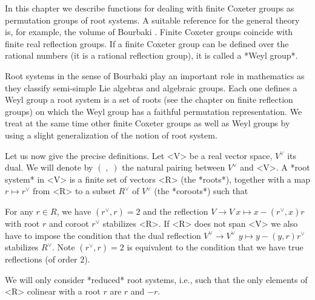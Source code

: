 
In  this  chapter  we  describe  functions  for dealing with finite Coxeter
groups  as permutation groups of root systems. A suitable reference for the
general theory is, for example, the volume of Bourbaki \cite{Bou68}. Finite
Coxeter  groups coincide  with finite  real reflection  groups. If a finite
Coxeter  group can be defined  over the rational numbers  (it is a rational
reflection group), it is called a *Weyl group*.

Root systems in the sense of Bourbaki play an important role in mathematics
as  they classify semi-simple  Lie algebras and  algebraic groups. Each one
defines  a Weyl group\: a root system is a set of roots (see the chapter on
finite   reflection  groups)  on  which  the  Weyl  group  has  a  faithful
permutation  representation. We treat at the same time other finite Coxeter
groups  as well  as Weyl  groups by  using a  slight generalization  of the
notion of root system.

Let  us now give the  precise definitions. Let <V>  be a real vector space,
$V^\vee$  its dual. We will denote by $(\;,\;)$ the natural pairing between
$V^\vee$  and <V>. A  *root system* in  <V> is a  finite set of vectors <R>
(the  *roots*), together with a map $r\mapsto  r^\vee$ from <R> to a subset
$R^\vee$ of $V^\vee$ (the *coroots*) such that\:

For  any  $r\in  R$,  we  have  $(r^\vee,r)=2$ and the reflection $V\to V\:
x\mapsto x- (r^\vee,x) r$ with root $r$ and coroot $r^\vee$ stabilizes <R>.
If <R> does not span <V> we also have to impose the condition that the dual
reflection   $V^\vee  \rightarrow  V^\vee$\:  $y  \mapsto  y  -(y,r)r^\vee$
stabilizes  $R^\vee$. Note  $(r^\vee,r)=2$ is  equivalent to  the condition
that we have true reflections (of order $2$).

We will only  consider *reduced* root systems, i.e., such  that the only
elements of <R> colinear with a root $r$ are $r$ and $-r$.


